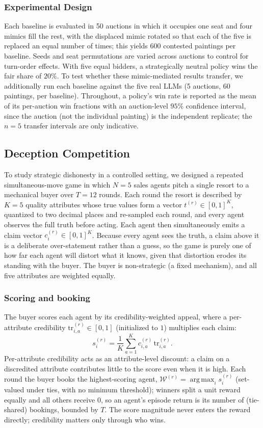 \documentclass[conference]{IEEEtran}
\begin{document}
\subsubsection{Experimental Design}
Each baseline is evaluated in 50 auctions in which it occupies one seat and four mimics fill the rest, with the displaced mimic rotated so that each of the five is replaced an equal number of times; this yields 600 contested paintings per baseline. Seeds and seat permutations are varied across auctions to control for turn-order effects. With five equal bidders, a strategically neutral policy wins the fair share of $20\%$. To test whether these mimic-mediated results transfer, we additionally run each baseline against the five real LLMs (5 auctions, 60 paintings, per baseline). Throughout, a policy's win rate is reported as the mean of its per-auction win fractions with an auction-level $95\%$ confidence interval, since the auction (not the individual painting) is the independent replicate; the $n=5$ transfer intervals are only indicative.

\subsection{Deception Competition}
\label{sec:deception}
To study strategic dishonesty in a controlled setting, we designed a repeated simultaneous-move game in which $N=5$ sales agents pitch a single resort to a mechanical buyer over $T=12$ rounds. Each round the resort is described by $K=5$ quality attributes whose true values form a vector $t^{(r)}\in[0,1]^{K}$, quantized to two decimal places and re-sampled each round, and every agent observes the full truth before acting. Each agent then simultaneously emits a claim vector $c_i^{(r)}\in[0,1]^{K}$. Because every agent sees the truth, a claim above it is a deliberate over-statement rather than a guess, so the game is purely one of how far each agent will distort what it knows, given that distortion erodes its standing with the buyer. The buyer is non-strategic (a fixed mechanism), and all five attributes are weighted equally.

\subsubsection{Scoring and booking}
The buyer scores each agent by its credibility-weighted appeal, where a per-attribute credibility $\mathrm{tr}_{i,a}^{(r)}\in[0,1]$ (initialized to $1$) multiplies each claim:
\begin{equation}
s_i^{(r)} = \frac{1}{K}\sum_{a=1}^{K} c_{i,a}^{(r)}\,\mathrm{tr}_{i,a}^{(r)}.
\label{eq:dec5-score}
\end{equation}
Per-attribute credibility acts as an attribute-level discount: a claim on a discredited attribute contributes little to the score even when it is high. Each round the buyer books the highest-scoring agent, $\mathcal{W}^{(r)}=\operatorname*{arg\,max}_i s_i^{(r)}$ (set-valued under ties, with no minimum threshold); winners split a unit reward equally and all others receive $0$, so an agent's episode return is its number of (tie-shared) bookings, bounded by $T$. The score magnitude never enters the reward directly; credibility matters only through who wins.
\end{document}
